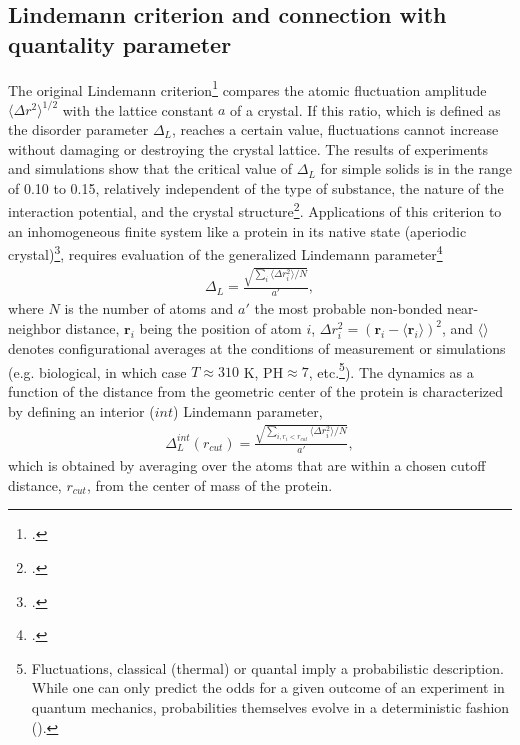 \begin{subappendices}
\section[Lindemann criterion and  quantality parameter]{Lindemann criterion and connection with quantality parameter}\label{C2AppC}
The original Lindemann criterion\footnote{\cite{Lindemann:10}.} compares the atomic fluctuation amplitude $\langle\Delta r^2\rangle^{1/2}$ with the lattice constant $a$ of a crystal. If this ratio, which is defined as the disorder parameter $\Delta_L$, reaches a certain value, fluctuations cannot increase without damaging or destroying the crystal lattice. The results of experiments and simulations show that the critical value of $\Delta_L$ for simple solids is in the range of 0.10 to 0.15, relatively independent of the type of substance, the nature of the interaction potential, and the crystal structure\footnote{\cite{Bilgram:87,Lowen:94,Stillinger:95}.}. Applications of this criterion to an inhomogeneous finite system like a protein in its native state (aperiodic crystal)\footnote{\cite{Schrodinger:44}.}, requires evaluation of the generalized Lindemann parameter\footnote{\cite{Stillinger:90}.}
\begin{align}
\Delta_L=\frac{\sqrt{\sum_i\langle \Delta r_i^2\rangle/N}}{a'},
\end{align}  
where $N$ is the number of atoms and $a'$ the most probable non-bonded near-neighbor distance, $\mathbf r_i$ being the position of atom $i$, $\Delta r_i^2=(\mathbf r_i-\langle \mathbf r_i\rangle)^2$, and $\langle\rangle$ denotes configurational averages at the conditions of measurement or simulations (e.g. biological, in which case $T\approx 310$ K, PH$\approx 7$, etc.\footnote{Fluctuations, classical (thermal) or quantal imply a probabilistic description. While one can only predict the odds for a given outcome of an experiment in quantum mechanics, probabilities themselves evolve in a deterministic fashion  (\cite{Born:48}).}). The dynamics as a function of the distance from the geometric center of the protein is characterized by defining an interior ($int$) Lindemann parameter, 
\begin{align}
\Delta^{int}_L(r_{cut})=\frac{\sqrt{\sum_{i,r_i<r_{cut}}\langle \Delta r_i^2\rangle/N}}{a'},
\end{align}  
which is obtained by averaging over the atoms that are within a chosen cutoff distance, $r_{cut}$, from the center of mass of the protein.


\end{subappendices}
